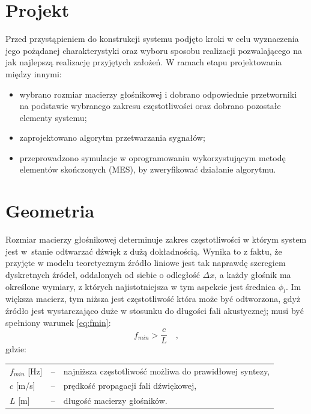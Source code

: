 \documentclass[12pt]{oska}
\let\Oldsection\section
\renewcommand{\section}{\FloatBarrier\Oldsection}
\begin{document}
\section{Projekt}

Przed przystąpieniem do konstrukcji systemu podjęto kroki w celu wyznaczenia jego pożądanej
charakterystyki oraz wyboru sposobu realizacji pozwalającego na jak najlepszą 
realizację przyjętych założeń. W ramach etapu projektowania między innymi:
\begin{itemize}
  \item wybrano rozmiar macierzy głośnikowej i dobrano odpowiednie przetworniki
  na podstawie wybranego zakresu częstotliwości oraz dobrano pozostałe elementy systemu;
  \item zaprojektowano algorytm przetwarzania sygnałów;
  \item przeprowadzono symulacje w oprogramowaniu wykorzystującym metodę
    elementów skończonych (MES), by zweryfikować działanie algorytmu.
\end{itemize}

\section{Geometria}

Rozmiar macierzy głośnikowej determinuje zakres częstotliwości w którym system
jest w~stanie odtwarzać dźwięk z dużą dokładnością. Wynika to z faktu, że przyjęte 
w modelu teoretycznym źródło liniowe jest tak naprawdę szeregiem dyskretnych źródeł, 
oddalonych od siebie o odległość $\Delta x$, a każdy głośnik ma określone wymiary, z których
najistotniejsza w tym aspekcie jest średnica $\phi_l$. Im większa macierz, tym niższa jest częstotliwość która
może być odtworzona, gdyż źródło jest wystarczająco duże w stosunku do długości
fali akustycznej; musi być spełniony warunek \eqref{eq:fmin}:
\begin{equation}
  f_{min}>\frac{c}{L} \quad,	\label{eq:fmin}
\end{equation}
gdzie:\\
	\indent \begin{tabular}{l c l}
			$f_{min}$ [\si{\hertz}] & -- & najniższa częstotliwość możliwa do prawidłowej syntezy, \\
			$c$ [\si[per-mode=symbol]{\metre\per\second}] & -- & prędkość propagacji fali dźwiękowej, \\
			$L$ [\si{\metre}] & -- & długość macierzy głośników. \\
		\end{tabular}\\
\end{document}
